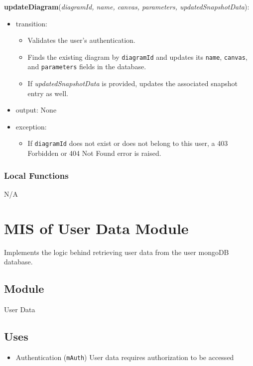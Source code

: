 \documentclass[12pt, titlepage]{article}
\begin{document}
\noindent \textbf{updateDiagram}(\textit{diagramId, name, canvas, parameters, updatedSnapshotData}):
\begin{itemize}
\item transition: 
  \begin{itemize}
    \item Validates the user's authentication.
    \item Finds the existing diagram by \texttt{diagramId} and updates its \texttt{name}, \texttt{canvas}, and \texttt{parameters} fields in the database.
    \item If \textit{updatedSnapshotData} is provided, updates the associated snapshot entry as well.
  \end{itemize}
\item output: None
\item exception:
  \begin{itemize}
    \item If \texttt{diagramId} does not exist or does not belong to this user, a 403 Forbidden or 404 Not Found error is raised.
  \end{itemize}
\end{itemize}

\subsubsection{Local Functions}

N/A

\newpage

\section{MIS of User Data Module} \label{mUser}
Implements the logic behind retrieving user data from the user mongoDB database.

\subsection{Module}

User Data

\subsection{Uses}
\begin{itemize}
  \item Authentication (\texttt{mAuth}) User data requires authorization to be accessed
\end{itemize}
\end{document}
